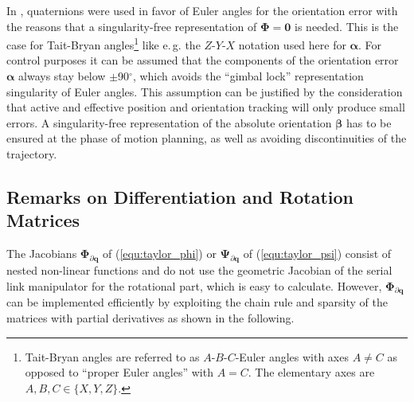 \documentclass{svproc}
\newcommand{\bm}[1]{\boldsymbol{#1}}
\begin{document}
In \cite{Zlajpah2017}, quaternions were used in favor of Euler angles for the orientation error with the reasons that a singularity-free representation of $\bm{\Phi}=\bm{0}$ is needed.
This is the case for Tait-Bryan angles\footnote{Tait-Bryan angles are referred to as $A$-$B$-$C$-Euler angles with axes $A \ne C$ as opposed to ``proper Euler angles'' with $A = C$. The elementary axes are $A,B,C \in \{ X,Y,Z\}$.} like e.\,g. the $Z$-$Y$-$X$ notation used here for $\bm{\alpha}$.
For control purposes it can be assumed that the components of the orientation error $\bm{\alpha}$ always stay below $\pm$90$^\circ$, which avoids the ``gimbal lock'' representation singularity of Euler angles.
This assumption can be justified by the consideration that active and effective position and orientation tracking will only produce small errors.
A singularity-free representation of the absolute orientation $\bm{\beta}$ has to be ensured at the phase of motion planning, as well as avoiding discontinuities of the trajectory.

\subsection{Remarks on Differentiation and Rotation Matrices}
\label{sec:RecEulAng_implement}

The Jacobians $\bm{\Phi}_{\partial\bm{q}}$ of (\ref{equ:taylor_phi}) or $\bm{\Psi}_{\partial\bm{q}}$ of (\ref{equ:taylor_psi}) consist of nested non-linear functions and do not use the geometric Jacobian of the serial link manipulator for the rotational part, which is easy to calculate. 
%
However, $\bm{\Phi}_{\partial\bm{q}}$ can be implemented efficiently by exploiting the chain rule and sparsity of the matrices with partial derivatives as shown in the following.
\end{document}
